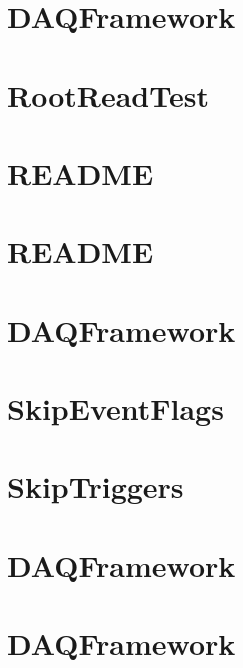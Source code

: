 \let\mypdfximage\pdfximage\def\pdfximage{\immediate\mypdfximage}\documentclass[twoside]{book}
\newcommand{\+}{\discretionary{\mbox{\scriptsize$\hookleftarrow$}}{}{}}
\begin{document}
\chapter{DAQFramework}
\label{md_UserTools_RelicMuonPlots_README}

\chapter{Root\+Read\+Test}
\label{md_UserTools_RootReadTest_README}

\chapter{README}
\label{md_UserTools_RunwiseEnergyCut_README}

\chapter{README}
\label{md_UserTools_SimplifyTree_README}

\chapter{DAQFramework}
\label{md_UserTools_SK2p2MeV_README}

\chapter{Skip\+Event\+Flags}
\label{md_UserTools_SkipEventFlags_README}

\chapter{Skip\+Triggers}
\label{md_UserTools_SkipTriggers_README}

\chapter{DAQFramework}
\label{md_UserTools_SLESearch_README}

\chapter{DAQFramework}
\label{md_UserTools_SpectralFit_README}

\end{document}
